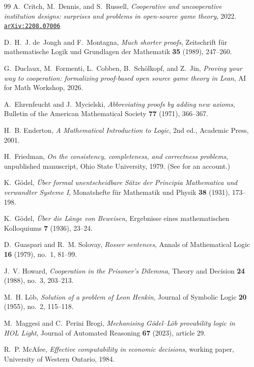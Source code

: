 \documentclass[11pt]{amsart}
\newcommand{\arxiv}[1]{\href{https://arxiv.org/abs/#1}{\texttt{arXiv:#1}}}
\theoremstyle{plain}
\theoremstyle{definition}
\begin{document}
\begin{thebibliography}{99}
A.~Critch, M.~Dennis, and S.~Russell,
\emph{Cooperative and uncooperative institution designs: surprises and problems in open-source game theory},
2022. \arxiv{2208.07006}

D.~H.~J. de~Jongh and F.~Montagna,
\emph{Much shorter proofs},
Zeitschrift f\"ur mathematische Logik und Grundlagen der Mathematik \textbf{35} (1989), 247--260.

G.~Duclaux, M.~Formenti, L.~Cobben, B.~Sch\"olkopf, and Z.~Jin,
\emph{Proving your way to cooperation: formalizing proof-based open source game theory in Lean},
AI for Math Workshop, 2026.

A.~Ehrenfeucht and J.~Mycielski,
\emph{Abbreviating proofs by adding new axioms},
Bulletin of the American Mathematical Society \textbf{77} (1971), 366--367.

H.~B. Enderton,
\emph{A Mathematical Introduction to Logic},
2nd ed., Academic Press, 2001.

H.~Friedman,
\emph{On the consistency, completeness, and correctness problems},
unpublished manuscript, Ohio State University, 1979. (See \cite{pudlak2017} for an account.)

K.~G\"odel,
\emph{\"Uber formal unentscheidbare S\"atze der Principia Mathematica und verwandter Systeme I},
Monatshefte f\"ur Mathematik und Physik \textbf{38} (1931), 173--198.

K.~G\"odel,
\emph{\"Uber die L\"ange von Beweisen},
Ergebnisse eines mathematischen Kolloquiums \textbf{7} (1936), 23--24.

D.~Guaspari and R.~M. Solovay,
\emph{Rosser sentences},
Annals of Mathematical Logic \textbf{16} (1979), no.~1, 81--99.

J.~V. Howard,
\emph{Cooperation in the Prisoner's Dilemma},
Theory and Decision \textbf{24} (1988), no.~3, 203--213.

M.~H. L\"ob,
\emph{Solution of a problem of Leon Henkin},
Journal of Symbolic Logic \textbf{20} (1955), no.~2, 115--118.

M.~Maggesi and C.~Perini Brogi,
\emph{Mechanising G\"odel--L\"ob provability logic in HOL Light},
Journal of Automated Reasoning \textbf{67} (2023), article 29.

R.~P. McAfee,
\emph{Effective computability in economic decisions},
working paper, University of Western Ontario, 1984.


\end{thebibliography}
\end{document}
